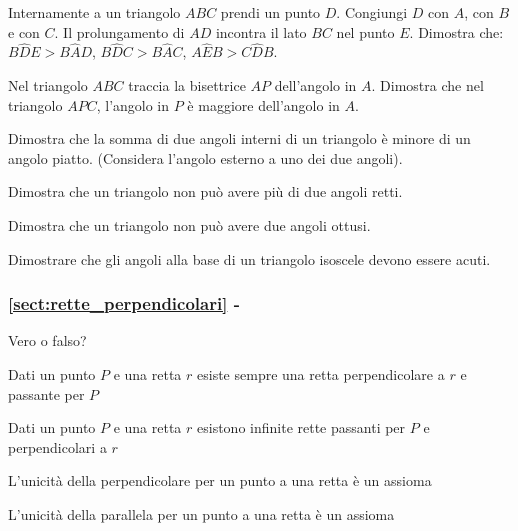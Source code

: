 \begin{esercizio}
\label{ese:3.4}
Internamente a un triangolo $ABC$ prendi un punto $D$. Congiungi $D$ con $A$, con $B$ e con $C$. Il prolungamento di $AD$ incontra il lato $BC$ nel punto $E$. Dimostra che: $B\widehat{D}E>B\widehat{A}D$, $B\widehat{D}C>B\widehat{A}C$, $A\widehat{E}B>C\widehat{D}B$.
\end{esercizio}

\begin{esercizio}
\label{ese:3.5}
Nel triangolo $ABC$ traccia la bisettrice $AP$ dell'angolo in $A$. Dimostra che nel triangolo $APC$, l'angolo in $P$ è maggiore dell'angolo in $A$.
\end{esercizio}

\begin{esercizio}
\label{ese:3.6}
Dimostra che la somma di due angoli interni di un triangolo è minore di un angolo piatto. (Considera l'angolo esterno a uno dei due angoli).
\end{esercizio}

\begin{esercizio}
\label{ese:3.7}
Dimostra che un triangolo non può avere più di due angoli retti.
\end{esercizio}

\begin{esercizio}
\label{ese:3.8}
Dimostra che un triangolo non può avere due angoli ottusi.
\end{esercizio}

\begin{esercizio}
\label{ese:3.9}
Dimostrare che gli angoli alla base di un triangolo isoscele devono essere acuti.
\end{esercizio}

\begingroup
\hypersetup{linkcolor=black}
\subsubsection*{\ref{sect:rette_perpendicolari} - }
\endgroup

\begin{esercizio}
\label{ese:3.10}
Vero o falso?
\begin{enumeratea}
\item Dati un punto $P$ e una retta $r$ esiste sempre una retta perpendicolare a $r$ e passante per $P$\tab\hfill\boxV\quad\boxF
\item Dati un punto $P$ e una retta $r$ esistono infinite rette passanti per $P$ e perpendicolari a $r$\tab\hfill\boxV\quad\boxF
\item L'unicità della perpendicolare per un punto a una retta è un assioma\hfill\boxV\quad\boxF
\item L'unicità della parallela per un punto a una retta è un assioma\hfill\boxV\quad\boxF
\end{enumeratea}
\end{esercizio}

